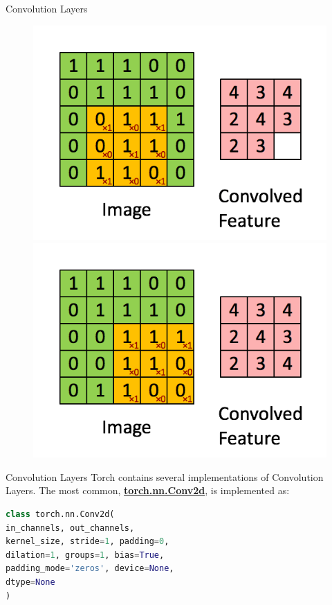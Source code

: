 \documentclass{beamer}
\begin{document}
\begin{frame}[fragile]{Convolution Layers}
\begin{figure}
\begin{overprint}
            \centering\includegraphics[width=.7\textwidth,height=\textheight,keepaspectratio]{figures/Convolution/Convolution-7.png}
            \centering\includegraphics[width=.7\textwidth,height=\textheight,keepaspectratio]{figures/Convolution/Convolution-8.png}
        \end{overprint}
    \end{figure}
\end{frame}
\begin{frame}[fragile]{Convolution Layers}
    Torch contains several implementations of Convolution Layers. The most common, \href{https://pytorch.org/docs/stable/generated/torch.nn.Conv2d.html}{\textbf{torch.nn.Conv2d}}, is implemented as:
    \begin{exampleblock}{}
        \begin{lstlisting}[language=Python]
class torch.nn.Conv2d(
in_channels, out_channels,
kernel_size, stride=1, padding=0,
dilation=1, groups=1, bias=True,
padding_mode='zeros', device=None,
dtype=None
)
        \end{lstlisting}
    \end{exampleblock}
\end{frame}
\end{document}
